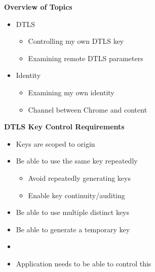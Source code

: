 \documentclass[helvetica]{seminar}
\newcommand{\heading}[1]{%
  \begin{center} 
    \large\bf 
    #1 
  \end{center} 
  \vspace{.4 in}}
\begin{document}
\begin{slide}
\begin{center}
\vspace{1 in}
\vspace{.2in}
\large{{Identity, Security, etc. API Issues}} \\
\vspace{3em}
\begin{tabular}{c}
Eric Rescorla \\
\url{ekr@rtfm.com}
\end{tabular}
}
\end{center}

\end{slide}


\centerslidesfalse 


\begin{slide}
\heading{Overview of Topics}

\begin{itemize}
\item DTLS
\begin{itemize}
  \item Controlling my own DTLS key
  \item Examining remote DTLS parameters
\end{itemize}

\item Identity
  \begin{itemize}
  \item Examining my own identity
  \item Channel between Chrome and content
  \end{itemize}
\end{itemize}
\end{slide}


\begin{slide}
\heading{DTLS Key Control Requirements}

\begin{itemize}
\item Keys are scoped to origin
\item Be able to use the same key repeatedly
  \begin{itemize}
  \item Avoid repeatedly generating keys
  \item Enable key continuity/auditing
  \end{itemize}

\item Be able to use multiple distinct keys
\item Be able to generate a temporary key
\item[]
\item Application needs to be able to control this
\end{itemize}
\end{slide}
\end{document}

